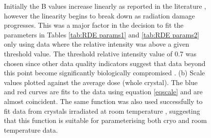 \begin{figure}
{		Initially the B values increase linearly as reported in the literature \cite{kmetko2006, warkentin2010, leal2012}, however the linearity begins to break down as radiation damage progresses.
		This was a major factor in the decision to fit the parameters in Tables \ref{tab:RDE params1} and \ref{tab:RDE params2} only using data where the relative intensity was above a given threshold value.
		The threshold relative intensity value of 0.7 was chosen since other data quality indicators suggest that data beyond this point become significantly biologically compromised \cite{owen2006}.
		(b) Scale values plotted against the average dose (whole crystal).
		The blue and red curves are fits to the data using equation \ref{eqscale} and are almost coincident.
		The same function was also used successfully to fit data from crystals irradiated at room temperature \cite{leal2012}, suggesting that this function is suitable for parameterising both cryo and room temperature data.}
        \label{figlealparam}
\end{figure}

